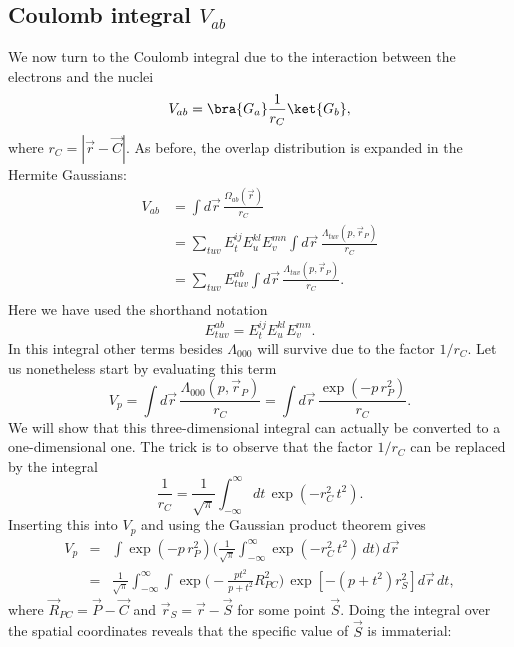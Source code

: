 \subsection{Coulomb integral $V_{ab}$}
\label{sec:V_ab}
We now turn to the Coulomb integral due to the interaction between the electrons and the nuclei
\begin{equation}
 V_{ab} = \bra{G_a}\frac{1}{r_C}\ket{G_b},
\end{equation}
where $r_C = |\vec r - \vec C|$. As before, the overlap distribution is expanded in the Hermite Gaussians:
\begin{equation}
\begin{split}
 V_{ab} & = \int d\vec r \,\frac{\Omega_{ab}(\vec r)}{r_C} \\
        & = \sum_{tuv}E^{ij}_t E^{kl}_u E^{mn}_v\int d\vec r \, \frac{\Lambda_{tuv}(p,\vec r_P)}{r_C} \\
        & = \sum_{tuv}E^{ab}_{tuv}\int d\vec r \, \frac{\Lambda_{tuv}(p,\vec r_P)}{r_C}. \\
\end{split}
\end{equation}
Here we have used the shorthand notation
\begin{equation}
 E^{ab}_{tuv} = E^{ij}_t E^{kl}_u E^{mn}_v.
\end{equation}
In this integral other terms besides $\Lambda_{000}$ will survive due to the factor $1/r_C$. Let us nonetheless start by evaluating this term
\begin{equation}
 V_p = \int d\vec r \, \frac{\Lambda_{000}(p,\vec r_P)}{r_C} = \int d\vec r\, \frac{\exp(-p\,r_P^2)}{r_C}.
\end{equation}
We will show that this three-dimensional integral can actually be converted to a one-dimensional one. The trick is to observe that the factor $1/r_C$ can be replaced by the integral
\begin{equation}
 \frac{1}{r_C} = \frac{1}{\sqrt{\pi}}\int_{-\infty}^\infty dt\,\exp(-r^2_C\,t^2).
\end{equation}
Inserting this into $V_p$ and using the Gaussian product theorem gives
\begin{eqnarray}
 V_p & = & \int \exp(-p\,r_P^2)\Big(\frac{1}{\sqrt{\pi}}\int_{-\infty}^\infty\exp(-r^2_C\,t^2)\,dt\Big)\,d\vec r \\
     & = & \frac{1}{\sqrt{\pi}}\int_{-\infty}^\infty\int\exp\Big(-\frac{pt^2}{p + t^2}R^2_{PC}\Big)\,\exp[-(p + t^2)r^2_S] d\vec r\, dt,
\end{eqnarray}
where $\vec R_{PC} = \vec P - \vec C$ and $\vec r_S = \vec r - \vec S$ for some point $\vec S$. Doing the integral over the spatial coordinates reveals that the specific value of $\vec S$ is immaterial:
